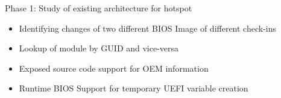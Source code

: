 \begin{frame}{Phase 1: Study of existing architecture for hotspot}
	\begin{itemize}
		\item Identifying changes of two different BIOS Image of different check-ins
		\item Lookup of module by GUID and vice-versa
		\item Exposed source code support for OEM information
		\item Runtime BIOS Support for temporary UEFI variable creation		
	\end{itemize}
\end{frame}